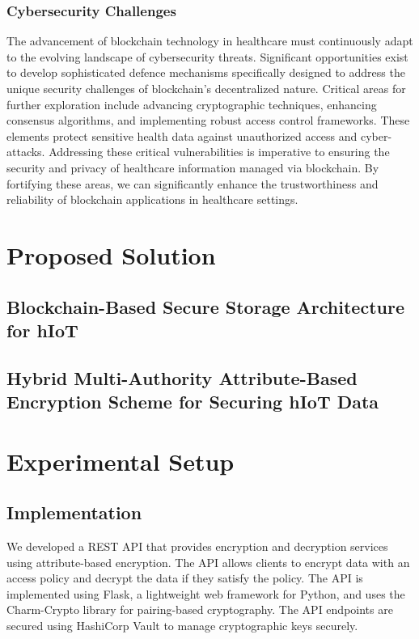\documentclass[cic,tc,english]{iiufrgs}
\begin{document}
        \subsection{Cybersecurity Challenges} 
            The advancement of blockchain technology in healthcare must continuously adapt to the evolving landscape of cybersecurity threats. Significant opportunities exist to develop sophisticated defence mechanisms specifically designed to address the unique security challenges of blockchain's decentralized nature. Critical areas for further exploration include advancing cryptographic techniques, enhancing consensus algorithms, and implementing robust access control frameworks. These elements protect sensitive health data against unauthorized access and cyber-attacks. Addressing these critical vulnerabilities is imperative to ensuring the security and privacy of healthcare information managed via blockchain. By fortifying these areas, we can significantly enhance the trustworthiness and reliability of blockchain applications in healthcare settings.

\chapter{Proposed Solution}
    \label{chap:proposedsolution}

    \section{Blockchain-Based Secure Storage Architecture for hIoT}
        \label{sec:architecture}

    \section{Hybrid Multi-Authority Attribute-Based Encryption Scheme for Securing hIoT Data}
        \label{sec:encryption}

\chapter{Experimental Setup}
    \label{chap:experimentalsetup}

    \section{Implementation}
        \label{sec:implementation}
        We developed a REST API that provides encryption and decryption services using attribute-based encryption. The API allows clients to encrypt data with an access policy and decrypt the data if they satisfy the policy. The API is implemented using Flask, a lightweight web framework for Python, and uses the Charm-Crypto library for pairing-based cryptography. The API endpoints are secured using HashiCorp Vault to manage cryptographic keys securely.
\end{document}
